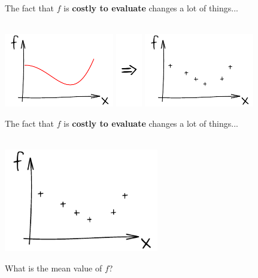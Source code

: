 \documentclass{beamer}
\begin{document}
\begin{frame}{}
The fact that $f$ is \textbf{costly to evaluate} changes a lot of things...\\
\vspace{5mm}
\\
\vspace{5mm}
\begin{center}
\includegraphics[height=3.2cm]{figures/ink_f} \includegraphics[height=3.2cm]{figures/Rightarrow} \includegraphics[height=3.2cm]{figures/ink_fX}
\end{center}
\end{frame}

\begin{frame}{}
The fact that $f$ is \textbf{costly to evaluate} changes a lot of things...\\
\vspace{5mm}
\\
\vspace{5mm}
\begin{center}
\includegraphics[height=4.5cm]{figures/ink_fX}
\end{center}
What is the mean value of $f$?
\end{frame}
\end{document}
